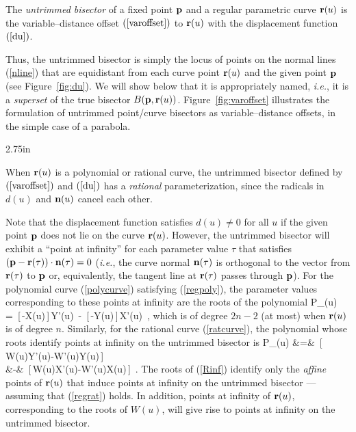 \begin{dfn}
The {\it untrimmed bisector\/} of a fixed point ${\bf p}$ and a
regular parametric curve ${\bf r}(u)$ is the variable--distance offset
$(\ref{varoffset})$ to ${\bf r}(u)$ with the displacement function
$(\ref{du})$.
\end{dfn}

Thus, the untrimmed bisector is simply the locus of points on the
normal lines (\ref{nline}) that are equidistant from each curve point
${\bf r}(u)$ and the given point ${\bf p}$ (see Figure~\ref{fig:du}).
We will show below that it is appropriately named, {\it i.e.}, it
is a {\it superset\/} of the true bisector $B({\bf p},{\bf r}(u))$.
Figure~\ref{fig:varoffset} illustrates the formulation of untrimmed
point/curve bisectors as variable--distance offsets, in the simple
case of a parabola.

{2.75in}

\begin{rmk}
{\rm
When ${\bf r}(u)$ is a polynomial or rational curve, the untrimmed
bisector defined by $(\ref{varoffset})$ and $(\ref{du})$ has a {\it
rational\/} parameterization, since the radicals in $d(u)$ and
${\bf n}(u)$ cancel each other.
}
\end{rmk}

Note that the displacement function satisfies $d(u)\not=0$ for all
$u$ if the given point ${\bf p}$ does not lie on the curve ${\bf r}(u)$.
However, the untrimmed bisector will exhibit a ``point at infinity''
for each parameter value $\tau$ that satisfies $({\bf p}-{\bf r}(\tau))
\cdot{\bf n}(\tau)=0$ ({\it i.e.}, the curve normal ${\bf n}(\tau)$
is orthogonal to the vector from ${\bf r}(\tau)$ to ${\bf p}$ or,
equivalently, the tangent line at ${\bf r}(\tau)$ passes through
${\bf p}$). For the polynomial curve (\ref{polycurve}) satisfying
(\ref{regpoly}), the parameter values corresponding to these points
at infinity are the roots of the polynomial
\be \label{Pinf}
P_\infty(u) \,=\,
[\,\alpha-X(u)\,]\,Y'(u) \,-\, [\,\beta-Y(u)\,]\,X'(u) \,,
\ee
which is of degree $2n-2$ (at most) when ${\bf r}(u)$ is of degree $n$.
Similarly, for the rational curve (\ref{ratcurve}), the polynomial whose
roots identify points at infinity on the untrimmed bisector is
\ba \label{Rinf}
P_\infty(u) \!
&=& \! [\,\alpha W(u)-X(u)\,]\,[\,W(u)Y'(u)-W'(u)Y(u)\,] \nonumber \\
&-& \! [\,\beta  W(u)-Y(u)\,]\,[\,W(u)X'(u)-W'(u)X(u)\,] \,.
\ea
The roots of (\ref{Rinf}) identify only the {\it affine\/} points of
${\bf r}(u)$ that induce points at infinity on the untrimmed bisector
--- assuming that (\ref{regrat}) holds. In addition, points at infinity
of ${\bf r}(u)$, corresponding to the roots of $W(u)$, will give rise
to points at infinity on the untrimmed bisector.

